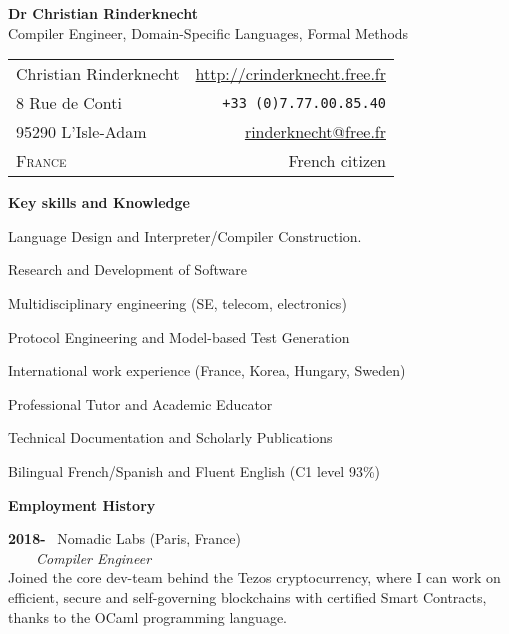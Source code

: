 \documentclass[a4paper,11pt]{article}
\begin{document}
\begin{center}
\textbf{\LARGE Dr Christian Rinderknecht}\\[5mm]
{\large Compiler Engineer, Domain-Specific Languages, Formal Methods}
\end{center}

\noindent
\begin{tabular}{@{}l@{\qquad\qquad\qquad\qquad}r@{}}
  Christian Rinderknecht
& \url{http://crinderknecht.free.fr}\\
  8 Rue de Conti
& \texttt{+33 (0)7.77.00.85.40}\\
  95290 L'Isle-Adam
& \url{rinderknecht@free.fr}\\
  \textsc{France}
& French citizen
\end{tabular}

\medskip


\pagestyle{empty}

\bigskip
\noindent\textbf{\large Key skills and Knowledge}
\begin{itemize*}

  \item Language Design and Interpreter/Compiler Construction.

  \item Research and Development of Software

  \item Multidisciplinary engineering (SE, telecom, electronics)

  \item Protocol Engineering and Model-based Test Generation

  \item International work experience (France, Korea, Hungary, Sweden)

  \item Professional Tutor and Academic Educator

  \item Technical Documentation and Scholarly Publications

  \item Bilingual French/Spanish and Fluent English (C1 level 93\%)

\end{itemize*}

\smallskip
\noindent\textbf{\large Employment History}
\bigskip

\noindent\textbf{2018-} \ \textsf{Nomadic Labs} (Paris,
  France)\\ \ \ \ \ \emph{Compiler Engineer}\\ Joined the core
  dev-team behind the Tezos cryptocurrency, where I can work on
  efficient, secure and self-governing blockchains with certified
  Smart Contracts, thanks to the OCaml programming language.
\end{document}
